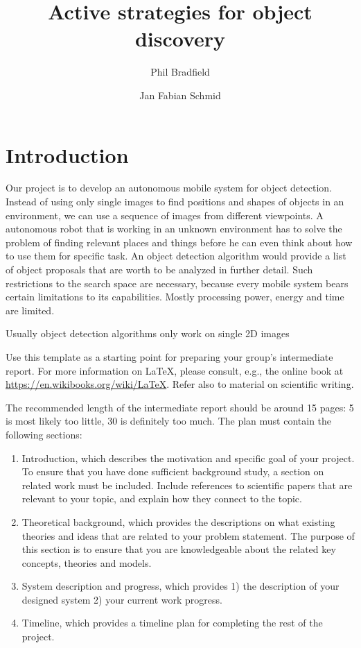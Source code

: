 \documentclass[a4paper,11pt,english]{article}
\begin{document}
\title{Active strategies for object discovery}
\author{Phil Bradfield \and Jan Fabian Schmid}
	
\maketitle 

\section{Introduction}
Our project is to develop an autonomous mobile system for object detection.
Instead of using only single images to find positions and shapes of objects in an environment, we can use a sequence of images from different viewpoints.
A autonomous robot that is working in an unknown environment has to solve the problem of finding relevant places and things before he can even think about how to use them for specific task.
An object detection algorithm would provide a list of object proposals that are worth to be analyzed in further detail.
Such restrictions to the search space are necessary, because every mobile system bears certain limitations to its capabilities. 
Mostly processing power, energy and time are limited.

Usually object detection algorithms only work on single 2D images \cite{atanasov2014nonmyopic}


Use this template as a starting point for preparing your group's intermediate report.
For more information on \LaTeX, please consult, e.g., the online book at \url{https://en.wikibooks.org/wiki/LaTeX}.
Refer also to material on scientific writing.

The recommended length of the intermediate report should be around 15 pages: 5 is most likely too little, 30 is definitely too much.
The plan must contain the following sections:
\begin{enumerate}
	\item Introduction, which describes the motivation and specific goal of your project. To ensure that you have done sufficient background study, a section on related work must be included. Include references to scientific papers that are relevant to your topic, and explain how they connect to the topic. 
	\item Theoretical background, which provides the descriptions on what existing theories and ideas that are related to your problem statement. The purpose of this section is to ensure that you are knowledgeable about the related key concepts, theories and models. 
	\item System description and progress, which provides 1) the description of your designed system 2) your current work progress.
	\item Timeline, which provides a timeline plan for completing the rest of the project.
\end{enumerate}
\end{document}
